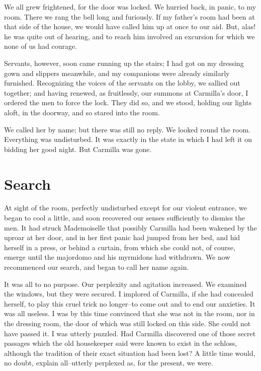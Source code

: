 \documentclass[11pt,twoside,makeidx,hidelinks,]{memoir}
\begin{document}
We all grew frightened, for the door was locked. We hurried back, in
panic, to my room. There we rang the bell long and furiously. If my
father's room had been at that side of the house, we would have called
him up at once to our aid. But, alas! he was quite out of hearing, and
to reach him involved an excursion for which we none of us had courage.

Servants, however, soon came running up the stairs; I had got on my
dressing gown and slippers meanwhile, and my companions were already
similarly furnished. Recognizing the voices of the servants on the
lobby, we sallied out together; and having renewed, as fruitlessly, our
summons at Carmilla's door, I ordered the men to force the lock. They
did so, and we stood, holding our lights aloft, in the doorway, and so
stared into the room.

We called her by name; but there was still no reply. We looked round the
room. Everything was undisturbed. It was exactly in the state in which I
had left it on bidding her good night. But Carmilla was gone.

\pbreak{}

\chapter{Search}\hypertarget{search}{}\label{search}

At sight of the room, perfectly undisturbed except for our violent
entrance, we began to cool a little, and soon recovered our senses
sufficiently to dismiss the men. It had struck Mademoiselle that
possibly Carmilla had been wakened by the uproar at her door, and in her
first panic had jumped from her bed, and hid herself in a press, or
behind a curtain, from which she could not, of course, emerge until the
majordomo and his myrmidons had withdrawn. We now recommenced our
search, and began to call her name again.

It was all to no purpose. Our perplexity and agitation increased. We
examined the windows, but they were secured. I implored of Carmilla, if
she had concealed herself, to play this cruel trick no longer--to come
out and to end our anxieties. It was all useless. I was by this time
convinced that she was not in the room, nor in the dressing room, the
door of which was still locked on this side. She could not have passed
it. I was utterly puzzled. Had Carmilla discovered one of those secret
passages which the old housekeeper said were known to exist in the
schloss, although the tradition of their exact situation had been lost?
A little time would, no doubt, explain all--utterly perplexed as, for
the present, we were.
\end{document}
